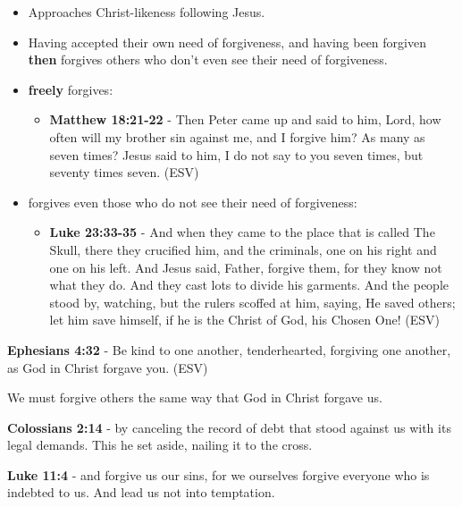 \documentclass[11pt]{article}
\begin{document}
\begin{itemize}
\begin{itemize}
\begin{itemize}
\end{itemize}
\item Approaches Christ-likeness following Jesus.
\item Having accepted their own need of forgiveness, and having been forgiven \textbf{then} forgives others who don't even see their need of forgiveness.
\item \textbf{freely} forgives:
\begin{itemize}
\item \textbf{Matthew 18:21-22} -  Then Peter came up and said to him, Lord, how often will my brother sin against me, and I forgive him?  As many as seven times?  Jesus said to him, I do not say to you seven times, but seventy times seven. (ESV)
\end{itemize}
\item forgives even those who do not see their need of forgiveness:
\begin{itemize}
\item \textbf{Luke 23:33-35} - And when they came to the place that is called The Skull, there they crucified him, and the criminals, one on his right and one on his left.  And Jesus said, Father, forgive them, for they know not what they do. And they cast lots to divide his garments.  And the people stood by, watching, but the rulers scoffed at him, saying, He saved others; let him save himself, if he is the Christ of God, his Chosen One! (ESV)
\end{itemize}
\end{itemize}
\end{itemize}

\textbf{Ephesians 4:32} - Be kind to one another, tenderhearted, forgiving one another, as God in Christ forgave you. (ESV)

We must forgive others the same way that God in Christ forgave us.

\textbf{Colossians 2:14} - by canceling the record of debt that stood against us with its legal demands. This he set aside, nailing it to the cross.

\textbf{Luke 11:4} - and forgive us our sins, for we ourselves forgive everyone who is indebted to us. And lead us not into temptation.
\end{document}
